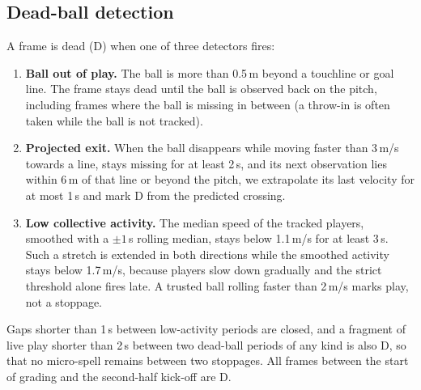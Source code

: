 \documentclass[11pt,a4paper]{article}
\begin{document}
\subsection{Dead-ball detection}
A frame is dead (D) when one of three detectors fires:
\begin{enumerate}
  \item \textbf{Ball out of play.} The ball is more than 0.5\,m beyond a touchline or goal line. The frame stays dead
    until the ball is observed back on the pitch, including frames where the ball is missing in between (a throw-in
    is often taken while the ball is not tracked).
  \item \textbf{Projected exit.} When the ball disappears while moving faster than 3\,m/s towards a line, stays missing
    for at least 2\,s, and its next observation lies within 6\,m of that line or beyond the pitch, we extrapolate its
    last velocity for at most 1\,s and mark D from the predicted crossing.
  \item \textbf{Low collective activity.} The median speed of the tracked players, smoothed with a $\pm1$\,s rolling
    median, stays below 1.1\,m/s for at least 3\,s. Such a stretch is extended in both directions while the smoothed
    activity stays below 1.7\,m/s, because players slow down gradually and the strict threshold alone fires late.
    A trusted ball rolling faster than 2\,m/s marks play, not a stoppage.
\end{enumerate}
Gaps shorter than 1\,s between low-activity periods are closed, and a fragment of live play shorter than 2\,s between
two dead-ball periods of any kind is also D, so that no micro-spell remains between two stoppages. All frames between
the start of grading and the second-half kick-off are D.
\end{document}
